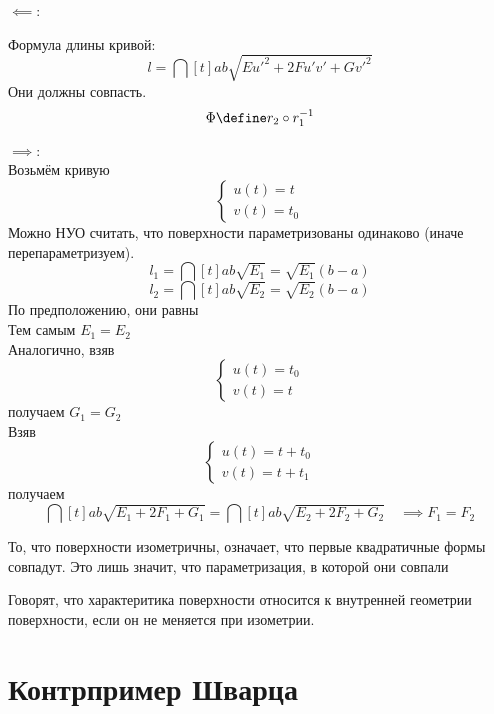 \begin{iproof}
	\item $ \impliedby $:

	Формула длины кривой:
	$$ l = \dint[t]{a}b{\sqrt{Eu'^2 + 2Fu'v' + Gv'^2}} $$
	Они должны совпасть.
	$$ \Phi \define r_2 \circ r_1^{-1} $$
	\item $ \implies $: \\
	Возьмём кривую
	$$
	\begin{cases}
		u(t) = t \\
		v(t) = t_0
	\end{cases} $$
	Можно НУО считать, что поверхности параметризованы одинаково (иначе перепараметризуем).
	$$ l_1 = \dint[t]{a}b{\sqrt{E_1}} = \sqrt{E_1}(b - a) $$
	$$ l_2 = \dint[t]{a}b{\sqrt{E_2}} = \sqrt{E_2}(b - a) $$
	По предположению, они равны \\
	Тем самым $ E_1 = E_2 $ \\
	Аналогично, взяв
	$$
	\begin{cases}
		u(t) = t_0 \\
		v(t) = t
	\end{cases} $$
	получаем $ G_1 = G_2 $ \\
	Взяв
	$$
	\begin{cases}
		u(t) = t + t_0 \\
		v(t) = t + t_1
	\end{cases} $$
	получаем
	$$ \dint[t]{a}b{\sqrt{E_1 + 2F_1 + G_1}} = \dint[t]{a}b{\sqrt{E_2 + 2F_2 + G_2}} \quad \implies F_1 = F_2 $$
\end{iproof}

\begin{remark}
	То, что поверхности изометричны,  означает, что первые квадратичные формы совпадут. Это лишь значит, что  параметризация, в которой они совпали
\end{remark}

\begin{definition}
	Говорят, что характеритика поверхности относится к внутренней геометрии поверхности, если он не меняется при изометрии.
\end{definition}

\section{Контрпример Шварца}

